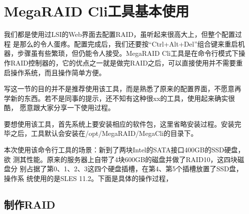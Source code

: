 \section{MegaRAID Cli工具基本使用}
\label{sec:MegaraidCmd}

我们都是使用过LSI的Web界面去配置RAID，虽听起来很高大上，但整个配置过程
是那么的令人蛋疼。配置完成后，我们还要按“Ctrl+Alt+Del”组合键来重启机
器，步骤虽有些繁琐，但仍能令人接受。MegaRAID Cli工具是在命令行模式下操
作RAID控制器的，它的优点之一就是做完RAID之后，可以直接使用并不需要重
启操作系统，而且操作简单方便。

写这一节的目的并不是推荐使用该工具，而是熟悉了原来的配置界面，不愿意再
学新的东西。若不是同事的提示，还不知有这种很xx的工具，使用起来确实很酷，
愿意跟大家分享一下使用过程。

要想使用该工具，首先系统上要安装相应的软件包，这里省略安装过程。安装完
毕之后，工具默认会安装在/opt/MegaRAID/MegaCli的目录下。

本次使用该命令行工具的场景：新到了两块Intel的SATA接口400GB的SSD硬盘，欲
测其性能。原来的服务器上自带了4块600GB的磁盘并做了RAID10，这四块磁盘分
别占据了第0、1、2、3这四个硬盘插槽，在第4、第5个插槽放置了SSD盘，操作系
统使用的是SLES 11.2。下面是具体的操作过程，

\subsection{制作RAID}

